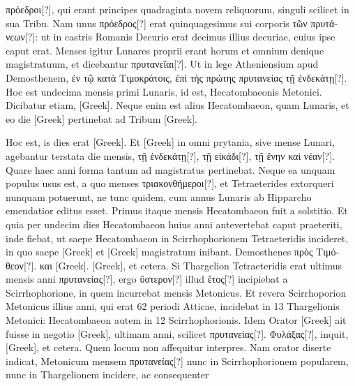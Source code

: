 \textgreek{πρόεδροι[?]}, qui erant principes quadraginta novem
 reliquorum, singuli
scilicet in sua Tribu.
Nam unus \textgreek{πρόεδρος[?]} erat quinquagesimus sui
corporis \textgreek{τῶν πρυτάνεων[?]}: ut in castris Romanis Decurio erat
 decimus
illius decuriae, cuius ipse caput erat.
Menses igitur Lunares proprii
erant horum et omnium denique magistratuum, et dicebantur
 \textgreek{πρυτανεῖαι[?]}.
Ut in lege Atheniensium apud Demosthenem, \textgreek{ἐν τῷ κατὰ
 Τιμοκράτοις,
ἐπὶ τὴς πρώτης πρυτανείας τῇ ἑνδεκάτῃ[?]}.
Hoc est undecima mensis
primi Lunaris, id est, Hecatombaeonis Metonici.
Dicibatur etiam,
\textgreek{[Greek]}.
Neque enim est alius Hecatombaeon, quam Lunaris, et eo
die \textgreek{[Greek]} pertinebat ad Tribum \textgreek{[Greek]}.

Hoc est, is dies erat \textgreek{[Greek]}.
Et \textgreek{[Greek]} in omni prytania, sive
mense Lunari, agebantur terstata die mensis, \textgreek{τῇ ἑνδεκάτῃ[?]},
 \textgreek{τῇ εἰκάδι[?]}, \textgreek{τῇ ἔνην καὶ νέαν[?]}.
Quare haec anni forma tantum ad magistratus pertinebat.
Neque
ea unquam populus usus est, a quo menses \textgreek{τριακονθήμεροι[?]},
 et Tetraeterides
extorqueri nunquam potuerunt, ne tunc quidem, cum annus Lunaris
ab Hipparcho emendatior editus esset.
Primus itaque mensis Hecatombaeon
fuit a solstitio.
Et quia per undecim dies Hecatombaeon
huius anni antevertebat caput praeteriti, inde fiebat, ut saepe Hecatombaeon
in Scirrhophorionem Tetraeteridis incideret, in quo saepe \textgreek{[Greek]}
et \textgreek{[Greek]} magistratum inibant.
Demosthenes \textgreek{πρὸς Τιμόθεον[?]}.
\textgreek{και [Greek]}.
\textgreek{[Greek]}, et cetera.
Si Thargelion Tetraeteridis erat ultimus mensis anni
\textgreek{πρυτανείας[?]}, ergo \textgreek{ὔστερον[?]} illud
 \textgreek{ἔτος[?]} incipiebat a Scirrhophorione, in
quem incurrebat mensis Metonicus.
Et revera Scirrhoporion Metonicus
illius anni, qui erat 62 periodi Atticae, incidebat in 13 Thargelionis
Metonici: Hecatombaeon autem in 12 Scirrhophorionis.
Idem Orator
\textgreek{[Greek]} ait fuisse in negotio
\textgreek{[Greek]}, ultimam anni, scilicet \textgreek{πρυτανείας[?]}.
\textgreek{Φυλάξας[?]}, inquit, \textgreek{[Greek]}, et cetera.
Quem locum non affequitur interpres.
Nam orator diserte
indicat, Metonicum mensem \textgreek{πρυτανείας[?]} nunc in Scirrhophorionem
popularem, nunc in Thargelionem incidere, ac consequenter
